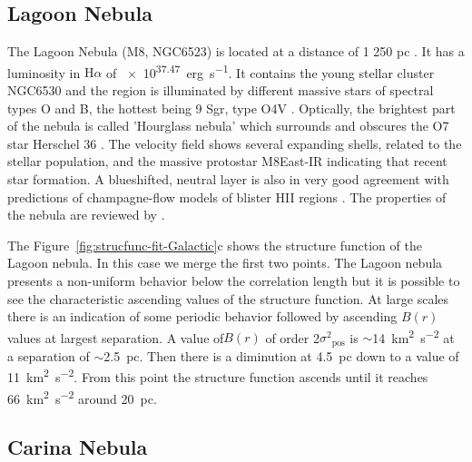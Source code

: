 \documentclass[fleqn,usenatbib, useAMS, a4paper]{mnras}
\newcommand\pos{\ensuremath{_{\mathrm{pos}}}}
\newcommand\ha{\ensuremath{\text{H}\alpha}}
\begin{document}
\subsection{Lagoon Nebula}
\label{sec:lagoon-nebula}

The Lagoon Nebula (M8, NGC6523) is located at a distance of 1 250 pc \citetext{\SI{1}{\arcsecond} = \SI{0.006}{pc} ; \citealp{2005A&A...430..941P}}.
It has a luminosity in \ha{} of \SI{e37.47}{erg.s^{-1}}\citep{1984ApJ...287..116K}.
It contains the young stellar cluster NGC6530 and the region is illuminated by different massive stars of spectral types O and B, the hottest being 9 Sgr, type O4V \citep{Damiani:2017b}.
Optically, the brightest part of the nebula is called 'Hourglass nebula' which surrounds and obscures the O7 star Herschel 36 \citep{1986AJ.....91..870W}. 
The velocity field shows several expanding shells, related to the stellar population, and the massive protostar M8East-IR \citep{1984ApJ...278..170S} indicating that recent star formation. 
A blueshifted, neutral layer is also in very good agreement with predictions of champagne-flow models of blister HII regions \citep{Damiani:2017b}. 
The properties of the nebula are reviewed by \citet{2008hsf2.book..533T}.

The Figure~\ref{fig:strucfunc-fit-Galactic}c shows the structure function of the Lagoon nebula.
In this case we merge the first two points.
The Lagoon nebula presents a non-uniform behavior below the correlation length but it is possible to see the characteristic ascending values of the structure function.
At large scales there is an indication of some periodic behavior followed by ascending \(B(r)\) values at largest separation.
A value of\(B(r)\) of order 2\(\sigma^2\pos\) is \(\sim\)\SI{14}{km^{2}.s^{-2}} at a separation of \(\sim\)\SI{2.5}{pc}. 
Then there is a diminution at \SI{4.5}{pc} down to a value of \SI{11}{km^{2}.s^{-2}}.
From this point the structure function ascends until it reaches \SI{66}{km^{2}.s^{-2}} around \SI{20}{pc}.

\subsection{Carina Nebula}
\label{sec:carina-nebula}
\end{document}
